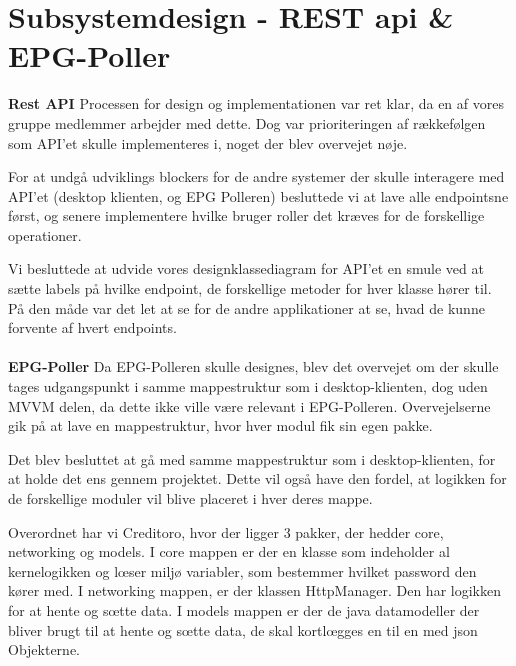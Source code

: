 \section{Subsystemdesign - REST api \& EPG-Poller}\label{api_epg_design}
{\large\textbf{Rest API}}
Processen for design og implementationen var ret klar, da en af vores gruppe medlemmer arbejder med dette. Dog var prioriteringen af rækkefølgen som API'et skulle implementeres i, noget der blev overvejet nøje. 

For at undgå udviklings blockers for de andre systemer der skulle interagere med API'et (desktop klienten, og EPG Polleren) besluttede vi at lave alle endpointsne først, og senere implementere hvilke bruger roller det kræves for de forskellige operationer.

Vi besluttede at udvide vores designklassediagram for API'et en smule ved at sætte labels på hvilke endpoint, de forskellige metoder for hver klasse hører til. På den måde var det let at se for de andre applikationer at se, hvad de kunne forvente af hvert endpoints.\\ \\


{\large\textbf{EPG-Poller}}
Da EPG-Polleren skulle designes, blev det overvejet om der skulle tages udgangspunkt i samme mappestruktur som i desktop-klienten, dog uden MVVM delen, da dette ikke ville være relevant i EPG-Polleren. Overvejelserne gik på at lave en mappestruktur, hvor hver modul fik sin egen pakke.

Det blev besluttet at gå med samme mappestruktur som i desktop-klienten, for at holde det ens gennem projektet. Dette vil også have den fordel, at logikken for de forskellige moduler vil blive placeret i hver deres mappe.

Overordnet har vi Creditoro, hvor der ligger 3 pakker, der hedder core, networking og models.
I core mappen er der en klasse som indeholder al kernelogikken og lœser miljø variabler, som bestemmer hvilket password den kører med.
I networking mappen, er der klassen HttpManager. Den har logikken for at hente og sœtte data.
I models mappen er der de java datamodeller der bliver brugt til at hente og sœtte data, de skal kortlœgges en til en med json Objekterne.
